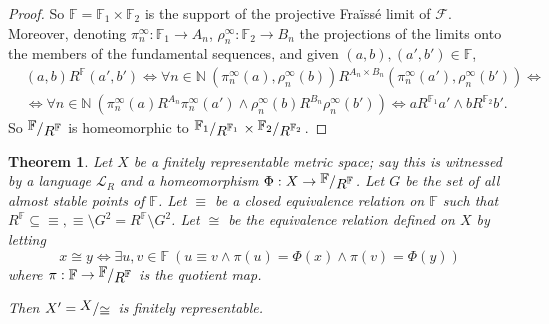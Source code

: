 \documentclass[12pt,twoside,a4paper]{amsart}
\theoremstyle{plain}
\newtheorem{theorem}{Theorem}
\theoremstyle{definition}
\begin{document}
\begin{proof}
\medskip
So $ \mathbb F= \mathbb F_1\times \mathbb F_2$ is the support of the projective Fra\"iss\'e limit of $ \mathcal F $.
Moreover, denoting $\pi_n^{\infty }: \mathbb F_1\to A_n$, $\rho_n^{\infty }: \mathbb F_2\to B_n$ the projections of the limits onto the members of the fundamental sequences, and given $(a,b),(a',b')\in \mathbb F $,
\[
\begin{split}
& (a,b)R^{ \mathbb F }(a',b')\Leftrightarrow\forall n\in {\mathbb N} \ (\pi_n^{\infty }(a),\rho_n^{\infty }(b))R^{A_n\times B_n}(\pi_n^{\infty }(a'),\rho_n^{\infty }(b'))\Leftrightarrow \\
& \Leftrightarrow\forall n\in {\mathbb N} \ (\pi_n^{\infty }(a)R^{A_n}\pi_n^{\infty }(a')\wedge\rho_n^{\infty }(b)R^{B_n}\rho_n^{\infty }(b'))\Leftrightarrow aR^{ \mathbb F_1}a'\wedge bR^{ \mathbb F_2}b'.
\end{split}
\]
So $ {{\raisebox{.2em}{${ \mathbb F}\!$}\left/\raisebox{-.2em}{${R^{ \mathbb F }}$}\right.}}$ is homeomorphic to $ {{\raisebox{.2em}{${ \mathbb F_1}\!$}\left/\raisebox{-.2em}{${R^{ \mathbb F_1}}$}\right.}}\times {{\raisebox{.2em}{${ \mathbb F_2}\!$}\left/\raisebox{-.2em}{${R^{ \mathbb F_2}}$}\right.}}$.
\end{proof}

\begin{theorem} \label{identification}
Let $X$ be a finitely representable metric space; say this is witnessed by a language $ \mathcal L_R$ and a homeomorphism $\Phi :X\to {{\raisebox{.2em}{${ \mathbb F }\!$}\left/\raisebox{-.2em}{${R^{ \mathbb F }}$}\right.}} $.
Let $G$ be the set of all almost stable points of $ \mathbb F $.
Let $\equiv $ be a closed equivalence relation on $ \mathbb F $ such that $R^{ \mathbb F }\subseteq {\equiv } , {\equiv }\setminus G^2=R^{ \mathbb F }\setminus G^2$.
Let $\cong $ be the equivalence relation defined on $X$ by letting
\[
x\cong y\Leftrightarrow\exists u,v\in \mathbb F\ (u\equiv v\wedge\pi (u)=\Phi (x)\wedge\pi (v)=\Phi (y))
\]
where $\pi : \mathbb F \to {{\raisebox{.2em}{${ \mathbb F }\!$}\left/\raisebox{-.2em}{${R^{ \mathbb F }}$}\right.}} $ is the quotient map.

Then $X'= {{\raisebox{.2em}{$X\!$}\left/\raisebox{-.2em}{${\cong }$}\right.}} $ is finitely representable.
\end{theorem}
\end{document}
